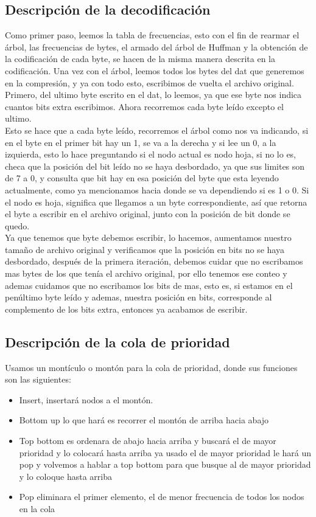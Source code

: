 \documentclass[12 pt]{report}
\begin{document}
\subsection{Descripción de la decodificación}

Como primer paso, leemos la tabla de frecuencias, esto con el fin de rearmar el árbol, las frecuencias de bytes, el armado del árbol de Huffman y la obtención de la codificación de cada byte, se hacen de la misma manera descrita en la codificación. Una vez con el árbol, leemos todos los bytes del dat que generemos en la compresión, y ya con todo esto, escribimos de vuelta el archivo original. Primero, del ultimo byte escrito en el dat, lo leemos, ya que ese byte nos indica cuantos bits extra escribimos. Ahora recorremos cada byte leído excepto el ultimo.\\
Esto se hace que a cada byte leído, recorremos el árbol como nos va indicando, si en el byte en el primer bit hay un 1, se va a la derecha y si lee un 0, a la izquierda, esto lo hace preguntando si el nodo actual es nodo hoja, si no lo es, checa que la posición del bit leído no se haya desbordado, ya que sus limites son de 7 a 0, y consulta que bit hay en esa posición del byte que esta leyendo actualmente, como ya mencionamos hacia donde se va dependiendo si es 1 o 0. Si el nodo es hoja, significa que llegamos a un byte correspondiente, así que retorna el byte a escribir en el archivo original, junto con la posición de bit donde se quedo. \\
Ya que tenemos que byte debemos escribir, lo hacemos, aumentamos nuestro tamaño de archivo original y verificamos que la posición en bits no se haya desbordado, después de la primera iteración, debemos cuidar que no escribamos mas bytes de los que tenía el archivo original, por ello tenemos ese conteo y ademas cuidamos que no escribamos los bits de mas, esto es, si estamos en el penúltimo byte leído y ademas, nuestra posición en bits, corresponde al complemento de los bits extra, entonces ya acabamos de escribir.

\subsection{Descripción de la cola de prioridad}
Usamos un montículo o montón para la cola de prioridad, donde sus funciones son las siguientes:\\
\begin{itemize}
\item Insert, insertará nodos a el montón.
\item Bottom up lo que hará es recorrer el montón de arriba hacia abajo
\item Top bottom es ordenara de abajo hacia arriba y buscará el de mayor prioridad y lo colocará hasta arriba ya usado el de mayor prioridad le hará un pop y volvemos a hablar a top bottom para que busque al de mayor prioridad y lo coloque hasta arriba
\item Pop eliminara el primer elemento, el de menor frecuencia de todos los nodos en la cola
\end{itemize}
\newpage
\end{document}
